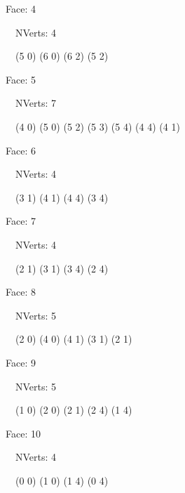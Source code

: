 \documentclass{article}
\begin{document}
    {\footnotesize

    Face: 4

    \   \    NVerts: 4

     \   \   (5 0) (6 0) (6 2) (5 2)}

    {\footnotesize

    Face: 5

    \   \    NVerts: 7

     \   \   (4 0) (5 0) (5 2) (5 3) (5 4) (4 4) (4 1)}

    {\footnotesize

    Face: 6

    \   \    NVerts: 4

     \   \   (3 1) (4 1) (4 4) (3 4)}

    {\footnotesize

    Face: 7

    \   \    NVerts: 4

     \   \   (2 1) (3 1) (3 4) (2 4)}

    {\footnotesize

    Face: 8

    \   \    NVerts: 5

     \   \   (2 0) (4 0) (4 1) (3 1) (2 1)}

    {\footnotesize

    Face: 9

    \   \    NVerts: 5

     \   \   (1 0) (2 0) (2 1) (2 4) (1 4)}

    {\footnotesize

    Face: 10

    \   \    NVerts: 4

     \   \   (0 0) (1 0) (1 4) (0 4)}


     \newpage
\end{document}
